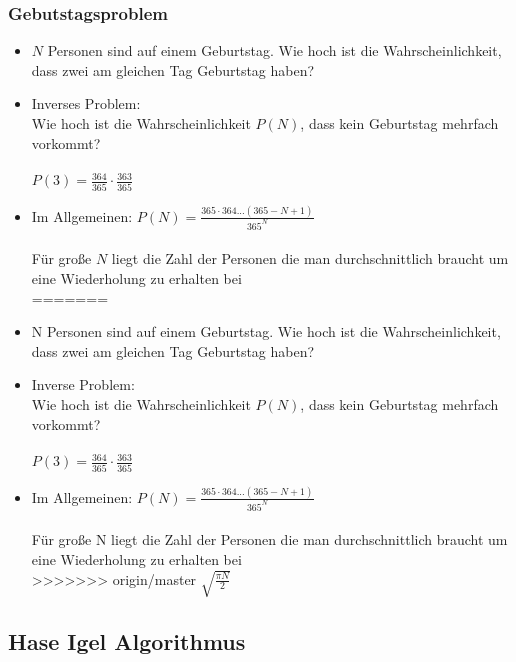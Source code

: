 \documentclass[mathserif, compress, german]{beamer}
\begin{document}
\begin{frame}
  \frametitle{Gebutstagsproblem}
  \begin{itemize}
<<<<<<< HEAD
    \item<2-> $N$ Personen sind auf einem Geburtstag. Wie hoch ist die Wahrscheinlichkeit, dass zwei am gleichen Tag Geburtstag haben?
    \vspace{3mm}
    \item<3-> Inverses Problem: \\ Wie hoch ist die Wahrscheinlichkeit $P(N)$, dass kein Geburtstag mehrfach vorkommt?\\
    \ \\ $P(3)=\frac{364}{365}\cdot \frac{363}{365}$
    \vspace{3mm}
    \item<4-> Im Allgemeinen: $P(N)=\frac{365\cdot 364...(365-N+1)}{365^N}$\\
    \ \\     F\"ur gro\ss{}e $N$ liegt die Zahl der Personen die man durchschnittlich braucht um eine Wiederholung zu erhalten bei \\
=======
    \item<2-> N Personen sind auf einem Geburtstag. Wie hoch ist die Wahrscheinlichkeit, dass zwei am gleichen Tag Geburtstag haben?
    \vspace{3mm}
    \item<3-> Inverse Problem: \\ Wie hoch ist die Wahrscheinlichkeit $P(N)$, dass kein Geburtstag mehrfach vorkommt?\\
    \ \\ $P(3)=\frac{364}{365}\cdot \frac{363}{365}$
    \vspace{3mm}
    \item<4-> Im Allgemeinen: $P(N)=\frac{365\cdot 364...(365-N+1)}{365^N}$\\
    \ \\     F\"ur gro\ss{}e N liegt die Zahl der Personen die man durchschnittlich braucht um eine Wiederholung zu erhalten bei \\
>>>>>>> origin/master
	     $\sqrt{\frac{\pi N}{2}}$
  \end{itemize}
\end{frame}

\subsection{Hase Igel Algorithmus}
\end{document}
